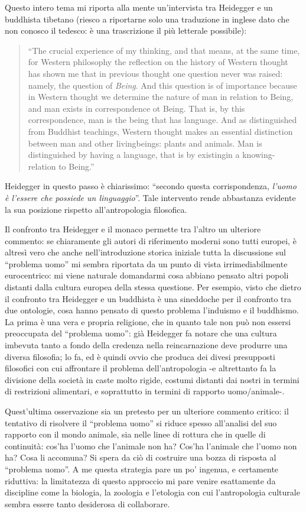 \documentclass[dvipsnames]{amsart}
\begin{document}
Questo intero tema mi riporta alla mente un'intervista tra Heidegger e un buddhista tibetano (riesco a riportarne solo una traduzione in inglese dato che non conosco il tedesco: è una trascrizione il più letterale possibile): 
\begin{quote}
``The crucial experience of my thinking, and that means, at the same time, for Western philosophy the reflection on the history of Western thought has shown me that in previous thought one question never was raised: namely, the question of \emph{Being}. And this question is of importance because in Western thought we determine the nature of man in relation to Being, and man exists in correspondence ot Being. That is, by this correspondence, man is the being that has language. And as distinguished from Buddhist teachings, Western thought makes an essential distinction between man and other livingbeings: plants and animals. Man is distinguished by having a language, that is by existingin a knowing-relation to Being.'' \hspace{\fill} \cite{heideggo}
\end{quote}
Heidegger in questo passo è chiarissimo: ``secondo questa corrispondenza, \emph{l'uomo è l'essere che possiede un linguaggio}''. Tale intervento rende abbastanza evidente la sua posizione rispetto all'antropologia filosofica. 

Il confronto tra Heidegger e il monaco permette tra l'altro un ulteriore commento: se chiaramente gli autori di riferimento moderni sono tutti europei, è altresì vero che anche nell'introduzione storica iniziale tutta la discussione sul ``problema uomo'' mi sembra riportata da un punto di vista irrimediabilmente eurocentrico: mi viene naturale domandarmi cosa abbiano pensato altri popoli distanti dalla cultura europea della stessa questione. Per esempio, visto che dietro il confronto tra Heidegger e un buddhista è una sineddoche per il confronto tra due ontologie, cosa hanno pensato di questo problema l'induismo e il buddhismo. La prima è una vera e propria religione, che in quanto tale non può non essersi preoccupata del ``problema uomo'': già Heidegger fa notare che una cultura imbevuta tanto a fondo della credenza nella reincarnazione deve produrre una diversa filosofia; lo fa, ed è quindi ovvio che produca dei divesi presupposti filosofici con cui affrontare il problema dell'antropologia -e altrettanto fa la divisione della società in caste molto rigide, costumi distanti dai nostri in termini di restrizioni alimentari, e soprattutto in termini di rapporto uomo/animale-.

Quest'ultima osservazione sia un pretesto per un ulteriore commento critico: il tentativo di risolvere il ``problema uomo'' si riduce spesso all'analisi del suo rapporto con il mondo animale, sia nelle linee di rottura che in quelle di continuità: cos'ha l'uomo che l'animale non ha? Cos'ha l'animale che l'uomo non ha? Cosa li accomuna? Si spera da ciò di costruire una bozza di risposta al ``problema uomo''. A me questa strategia pare un po' ingenua, e certamente riduttiva: la limitatezza di questo approccio mi pare venire esattamente da discipline come la biologia, la zoologia e l'etologia con cui l'antropologia culturale sembra essere tanto desiderosa di collaborare.
{}

\end{document}
